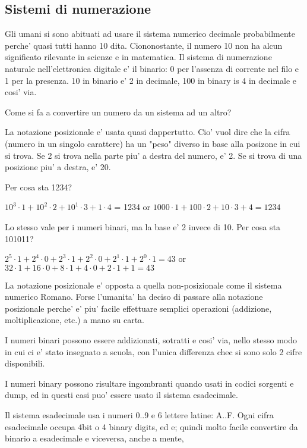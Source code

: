 \subsection{Sistemi di numerazione}

Gli umani si sono abituati ad usare il sistema numerico decimale probabilmente perche' quasi tutti hanno 10 dita.
Ciononostante, il numero 10 non ha alcun significato rilevante in scienze e in matematica.
Il sistema di numerazione naturale nell'elettronica digitale e' il binario: 0 per l'assenza di corrente nel filo e 1 per la presenza.
10 in binario e' 2 in decimale, 100 in binary is 4 in decimale e cosi' via.

Come si fa a convertire un numero da un sistema ad un altro?

La notazione posizionale e' usata quasi dappertutto. Cio' vuol dire che la cifra (numero in un singolo carattere) ha un "peso" diverso in base alla posizone in cui si trova. 
Se 2 si trova nella parte piu' a destra del numero, e' 2.
Se si trova di una posizione piu' a destra, e' 20.

Per cosa sta 1234?

$10^3 \cdot 1 + 10^2 \cdot 2 + 10^1 \cdot 3 + 1 \cdot 4$ = 1234 or 
$1000 \cdot 1 + 100 \cdot 2 + 10 \cdot 3 + 4 = 1234$

Lo stesso vale per i numeri binari, ma la base e' 2 invece di 10.
Per cosa sta 101011?

$2^5 \cdot 1 + 2^4 \cdot 0 + 2^3 \cdot 1 + 2^2 \cdot 0 + 2^1 \cdot 1 + 2^0 \cdot 1 = 43$ or
$32 \cdot 1 + 16 \cdot 0 + 8 \cdot 1 + 4 \cdot 0 + 2 \cdot 1 + 1 = 43$

La notazione posizionale e' opposta a quella non-posizionale come il sistema numerico Romano.
Forse l'umanita' ha deciso di passare alla notazione posizionale perche' e' piu' facile effettuare semplici operazioni (addizione, moltiplicazione, etc.) a mano su carta.

I numeri binari possono essere addizionati, sotratti e cosi' via, nello stesso modo in cui ci e' stato insegnato a scuola, con l'unica differenza chec si sono solo 2 cifre disponibili.

I numeri binary possono risultare ingombranti quando usati in codici sorgenti e dump, ed in questi casi puo' essere usato il sistema esadecimale.

Il sistema esadecimale usa i numeri 0..9 e 6 lettere latine: A..F.
Ogni cifra esadecimale occupa 4bit o 4 binary digits, ed e; quindi molto facile convertire da binario a esadecimale e viceversa, anche a mente,

